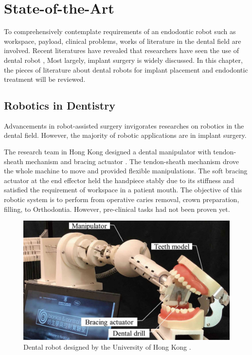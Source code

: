 \chapter{State-of-the-Art}
\label{chapter2}
\hspace*{6mm}To comprehensively contemplate requirements of an endodontic robot such as workspace, payload, clinical problems, works of literature in the dental field are involved. Recent literatures have revealed that researchers have seen the use of dental robot \cite{rawtiya2014application}\cite{s21103308}\cite{bhat2017robotics}, Most largely, implant surgery is widely discussed\cite{haidar2017autonomous}\cite{wu2019robotics}. In this chapter, the pieces of literature about dental robots for implant placement and endodontic treatment will be reviewed.
\section{Robotics in Dentistry}
\hspace*{6mm}Advancements in robot-assisted surgery invigorates researches on robotics in the dental field. However, the majority of robotic applications are in implant surgery. 
\par
The research team in Hong Kong designed a dental manipulator with tendon-sheath mechanism and bracing actuator \cite{Li2019ACD}. The tendon-sheath mechanism drove the whole machine to move and provided flexible manipulations. The soft bracing actuator at the end effector held the handpiece stably due to its stiffness and satisfied the requirement of workspace in a patient mouth. The objective of this robotic system is to perform from operative caries removal, crown preparation, filling, to Orthodontia. However, pre-clinical tasks had not been proven yet.
\begin{figure}[htbp]
\begin{center}
\includegraphics[width=0.9\linewidth]{Images/hongkong_1.png}
\caption[Dental robot designed by the University of Hong Kong]{
Dental robot designed by the University of Hong Kong \cite{Li2019ACD}.
}\label{fig:hongkong}
\end{center}
\end{figure}
